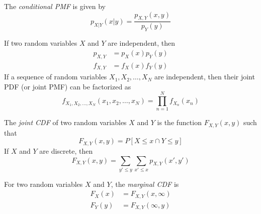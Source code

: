 The \emph{conditional PMF} is given by
\begin{equation}
    p_{X|Y}(x|y) = \frac{p_{X,Y}(x,y)}{p_{Y}(y)}
\end{equation}

If two random variables $X$ and $Y$ are independent,
then
\begin{align}
    p_{X,Y}  & = p_X(x)p_Y(y) \\
    f_{X, Y} & = f_X(x)f_Y(y)
\end{align}
If a sequence of random variables
$X_1, X_2, \dots, X_N$ are independent,
then their joint PDF (or joint PMF) can be
factorized as
\begin{equation}
    f_{X_1,X_2,\dots,X_N}\left(x_1,x_2,\dots,x_N\right) = \prod_{n=1}^{N}f_{X_n}(x_n)
\end{equation}

The \emph{joint CDF} of two random variables
$X$ and $Y$ is the function $F_{X,Y}(x,y)$ such
that
\begin{equation}
    F_{X,Y}(x,y) = P\left[X \leq x \cap Y \leq y\right]
\end{equation}
If $X$ and $Y$ are discrete, then
\begin{equation}
    F_{X,Y}(x,y) = \sum_{y'\leq y}\sum_{x' \leq x} p_{X,Y}(x',y')
\end{equation}

For two random variables $X$ and $Y$,
the \emph{marginal CDF} is
\begin{align}
    F_X(x) & = F_{X,Y}(x, \infty) \\
    F_Y(y) & = F_{X,Y}(\infty, y)
\end{align}

